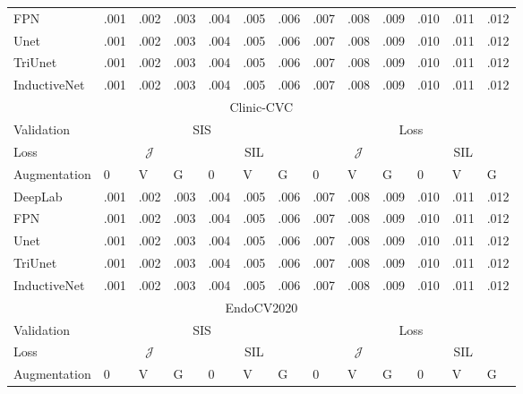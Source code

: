 \begin{table}[h]
\begin{tabularx}{\linewidth}{lXXXXXXXXXXXX}
            FPN & .001 & .002 & .003 & .004 & .005 & .006 & .007 & .008 & .009 & .010 & .011 & .012\\
            Unet & .001 & .002 & .003 & .004 & .005 & .006 & .007 & .008 & .009 & .010 & .011 & .012\\
            TriUnet & .001 & .002 & .003 & .004 & .005 & .006 & .007 & .008 & .009 & .010 & .011 & .012\\
            InductiveNet & .001 & .002 & .003 & .004 & .005 & .006 & .007 & .008 & .009 & .010 & .011 & .012\\
               \midrule
            \multicolumn{13}{c}{Clinic-CVC}\\
            \midrule
            Validation&\multicolumn{6}{c}{SIS} & \multicolumn{6}{c}{Loss} \\
            \cmidrule(lr){2-7} \cmidrule(lr){8-13}
           Loss &\multicolumn{3}{c}{\(\mathcal{J}\)} & \multicolumn{3}{c}{SIL}&\multicolumn{3}{c}{\(\mathcal{J}\)} & \multicolumn{3}{c}{SIL}\\
            \cmidrule(lr){2-4} \cmidrule(lr){5-7} \cmidrule(lr){8-10} \cmidrule(lr){11-13}
            Augmentation & 0 & V & G & 0 & V & G & 0 & V & G& 0 & V & G\\
            \midrule
            DeepLab & .001 & .002 & .003 & .004 & .005 & .006 & .007 & .008 & .009 & .010 & .011 & .012\\
            FPN & .001 & .002 & .003 & .004 & .005 & .006 & .007 & .008 & .009 & .010 & .011 & .012\\
            Unet & .001 & .002 & .003 & .004 & .005 & .006 & .007 & .008 & .009 & .010 & .011 & .012\\
            TriUnet & .001 & .002 & .003 & .004 & .005 & .006 & .007 & .008 & .009 & .010 & .011 & .012\\
            InductiveNet & .001 & .002 & .003 & .004 & .005 & .006 & .007 & .008 & .009 & .010 & .011 & .012\\
               \midrule
            \multicolumn{13}{c}{EndoCV2020}\\
            \midrule
            Validation&\multicolumn{6}{c}{SIS} & \multicolumn{6}{c}{Loss} \\
            \cmidrule(lr){2-7} \cmidrule(lr){8-13}
           Loss &\multicolumn{3}{c}{\(\mathcal{J}\)} & \multicolumn{3}{c}{SIL}&\multicolumn{3}{c}{\(\mathcal{J}\)} & \multicolumn{3}{c}{SIL}\\
            \cmidrule(lr){2-4} \cmidrule(lr){5-7} \cmidrule(lr){8-10} \cmidrule(lr){11-13}
            Augmentation & 0 & V & G & 0 & V & G & 0 & V & G& 0 & V & G\\

\end{tabularx}
\end{table}
